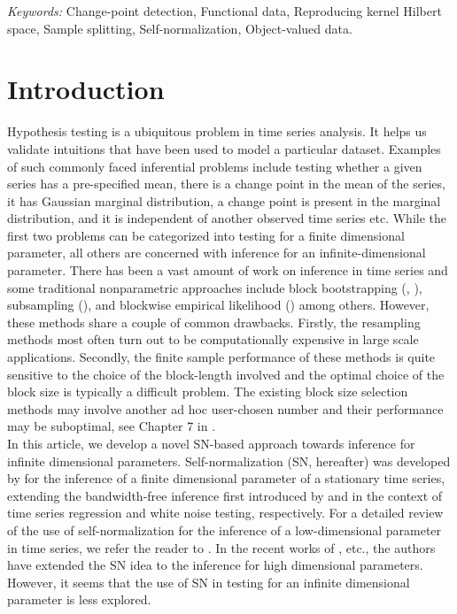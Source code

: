 \documentclass[11pt]{article}
\theoremstyle{plain}
\theoremstyle{definition}
\theoremstyle{remark}
\begin{document}
\noindent%
{\it Keywords:} Change-point detection, Functional data,  Reproducing kernel Hilbert space, Sample splitting, Self-normalization, Object-valued data.

\section{Introduction}
\label{sec:intro}
Hypothesis testing is a ubiquitous problem in time series analysis. It helps us validate intuitions that have been used to model a particular dataset. Examples of such commonly faced inferential problems include testing whether a given series has a pre-specified mean, there is a change point in the mean of the series, it has Gaussian marginal distribution, a change point is present in the marginal distribution, and it is independent of another observed time series etc. While the first two problems can be categorized into testing for a finite dimensional parameter, all others are concerned with inference for an infinite-dimensional parameter. There has been a vast amount of work on inference in time series and some traditional nonparametric
approaches include block bootstrapping (\cite{kunsch1989jackknife}, \cite{liu1992moving}), subsampling (\cite{politis1994large}), and blockwise empirical likelihood
(\cite{kitamura1997empirical}) among others. However, these methods share a couple of common drawbacks. Firstly, the resampling methods most often turn out to be computationally expensive in large scale applications. Secondly, the finite sample performance of these methods is quite sensitive to the choice of the block-length involved and the optimal choice of the block size is typically a difficult problem. The existing block size selection methods may involve another ad hoc user-chosen number and their performance may be suboptimal, see Chapter 7 in  \cite{lahiri2003resampling}.\\
\indent In this article, we develop a novel SN-based approach towards inference for infinite dimensional parameters. 
Self-normalization (SN, hereafter) was developed by \cite{shao2010self} for the inference of a finite dimensional parameter of a stationary time series, extending the bandwidth-free inference first introduced by \cite{kiefer2000simple} and \cite{lobato2001testing} in the context of time series regression and white
noise testing, respectively. For a detailed review of the use of self-normalization for the inference of a low-dimensional parameter in time series, we refer the reader to \cite{shao2015self}. In the recent works of \cite{wang2020hypothesis}, \cite{wang2022inference} etc., the authors have extended the SN idea to the inference for high dimensional parameters. However, it seems that the use of SN in testing for an infinite dimensional parameter is less explored. \\
\end{document}
